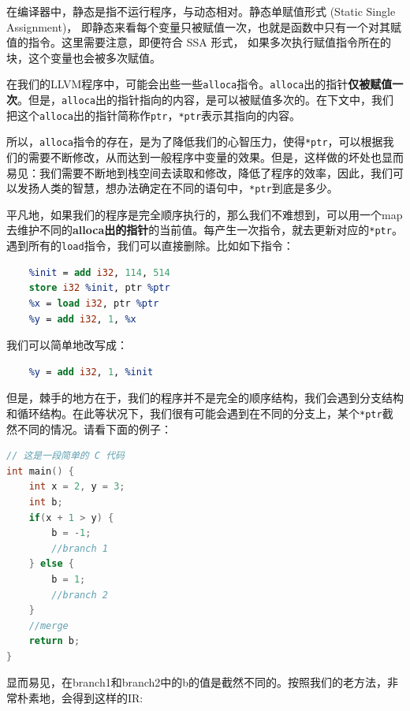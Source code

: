在编译器中，静态是指不运行程序，与动态相对。静态单赋值形式 (Static Single Assignment)，
即静态来看每个变量只被赋值一次，也就是函数中只有一个对其赋值的指令。这里需要注意，即便符合 SSA 形式，
如果多次执行赋值指令所在的块，这个变量也会被多次赋值。

在我们的LLVM程序中，可能会出些一些\texttt{alloca}指令。\texttt{alloca}出的指针\textbf{仅被赋值一次}。但是，\texttt{alloca}出的指针指向的内容，是可以被赋值多次的。在下文中，我们把这个\texttt{alloca}出的指针简称作\texttt{ptr}，\texttt{*ptr}表示其指向的内容。

所以，\texttt{alloca}指令的存在，是为了降低我们的心智压力，使得\texttt{*ptr}，可以根据我们的需要不断修改，从而达到一般程序中变量的效果。但是，这样做的坏处也显而易见：我们需要不断地到栈空间去读取和修改，降低了程序的效率，因此，我们可以发扬人类的智慧，想办法确定在不同的语句中，\texttt{*ptr}到底是多少。

平凡地，如果我们的程序是完全顺序执行的，那么我们不难想到，可以用一个map去维护不同的\textbf{alloca出的指针}的当前值。每产生一次指令，就去更新对应的\texttt{*ptr}。遇到所有的\texttt{load}指令，我们可以直接删除。比如如下指令：

\begin{lstlisting}[language=LLVM]
    %ptr = alloca i32
    %init = add i32, 114, 514
    store i32 %init, ptr %ptr
    %x = load i32, ptr %ptr
    %y = add i32, 1, %x
\end{lstlisting}

我们可以简单地改写成：

\begin{lstlisting}[language=LLVM]
    %init = add i32, 114, 514
    %y = add i32, 1, %init
\end{lstlisting}

但是，棘手的地方在于，我们的程序并不是完全的顺序结构，我们会遇到分支结构和循环结构。在此等状况下，我们很有可能会遇到在不同的分支上，某个\texttt{*ptr}截然不同的情况。请看下面的例子：

\begin{lstlisting}[language=C]
// 这是一段简单的 C 代码
int main() {
    int x = 2, y = 3;
    int b;
    if(x + 1 > y) {
        b = -1;
        //branch 1
    } else {
        b = 1;
        //branch 2
    }
    //merge
    return b;
}
\end{lstlisting}

显而易见，在branch1和branch2中的b的值是截然不同的。按照我们的老方法，非常朴素地，会得到这样的IR:

